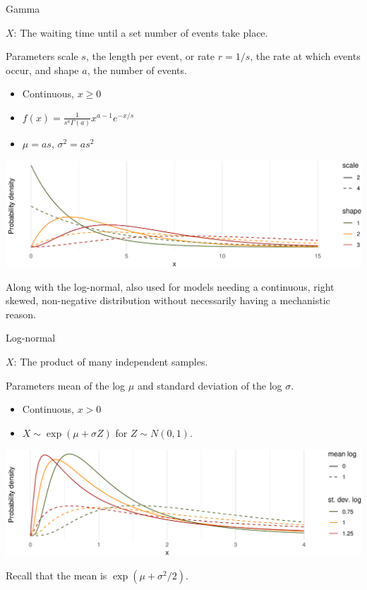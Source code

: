 \documentclass[
  ignorenonframetext,
]{beamer}
\providecommand{\tightlist}{%
  \setlength{\itemsep}{0pt}\setlength{\parskip}{0pt}}
\begin{document}
\begin{frame}{Gamma}
\protect\hypertarget{gamma}{}

\(X\): The waiting time until a set number of events take place.

Parameters scale \(s\), the length per event, or rate \(r=1/s\), the
rate at which events occur, and shape \(a\), the number of events.

\begin{itemize}
\tightlist
\item
  Continuous, \(x\geq 0\)
\item
  \(f(x)=\frac{1}{s^a\Gamma(a)}x^{a-1}e^{-x/s}\)
\item
  \(\mu=as\), \(\sigma^2=as^2\)
\end{itemize}

\includegraphics{noise_files/figure-beamer/unnamed-chunk-8-1.pdf}

Along with the log-normal, also used for models needing a continuous,
right skewed, non-negative distribution without necessarily having a
mechanistic reason.

\end{frame}

\begin{frame}{Log-normal}
\protect\hypertarget{log-normal}{}

\(X\): The product of many independent samples.

Parameters mean of the log \(\mu\) and standard deviation of the log
\(\sigma\).

\begin{itemize}
\tightlist
\item
  Continuous, \(x>0\)
\item
  \(X\sim \exp(\mu+\sigma Z)\) for \(Z\sim N(0,1)\).
\end{itemize}

\includegraphics{noise_files/figure-beamer/unnamed-chunk-9-1.pdf}

Recall that the mean is \(\exp(\mu+\sigma^2/2)\).

\end{frame}
\end{document}
